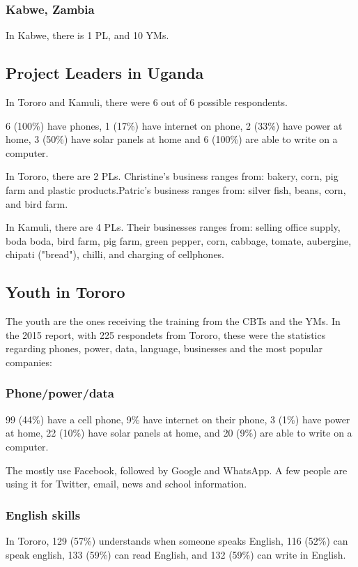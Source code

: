 \subsubsection{Kabwe, Zambia}
In Kabwe, there is 1 PL, and 10 YMs.

\subsection{Project Leaders in Uganda}
In Tororo and Kamuli, there were 6 out of 6 possible respondents.

6 (100\%) have phones, 1 (17\%) have internet on phone, 2 (33\%) have power at home, 3 (50\%) have solar panels at home and 6 (100\%) are able to write on a computer.

In Tororo, there are 2 PLs. Christine's business ranges from: bakery, corn, pig farm and plastic products.Patric's business ranges from: silver fish, beans, corn, and bird farm.

In Kamuli, there are 4 PLs. Their businesses ranges from: selling office supply, boda boda, bird farm, pig farm, green pepper, corn, cabbage, tomate, aubergine, chipati ("bread"), chilli, and charging of cellphones.

\subsection{Youth in Tororo}
The youth are the ones receiving the training from the CBTs and the YMs. In the 2015 report, with 225 respondets from Tororo, these were the statistics regarding phones, power, data, language, businesses and the most popular companies:

\subsubsection{Phone/power/data}
99 (44\%) have a cell phone, 9\% have internet on their phone, 3 (1\%) have power at home, 22 (10\%) have solar panels at home, and 20 (9\%) are able to write on a computer.

The mostly use Facebook, followed by Google and WhatsApp. A few people are using it for Twitter, email, news and school information.

\subsubsection{English skills}
In Tororo, 129 (57\%) understands when someone speaks English, 116 (52\%) can speak english, 133 (59\%) can read English, and 132 (59\%) can write in English.

